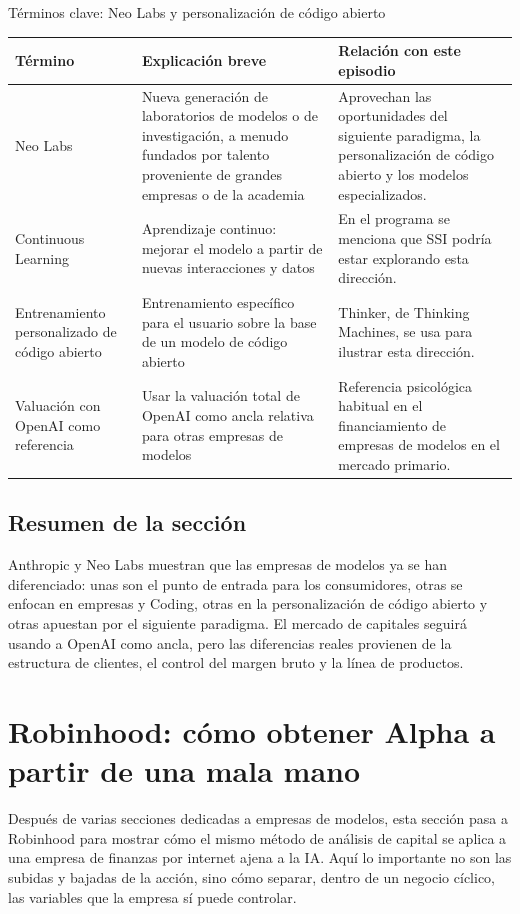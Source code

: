 \documentclass[a4paper]{article}
\begin{document}
\begin{knowledgebox}{Términos clave: Neo Labs y personalización de código abierto}
\begin{tabularx}{\textwidth}{p{}p{}X}
\toprule
Término & Explicación breve & Relación con este episodio \\
\midrule
Neo Labs & Nueva generación de laboratorios de modelos o de investigación, a menudo fundados por talento proveniente de grandes empresas o de la academia & Aprovechan las oportunidades del siguiente paradigma, la personalización de código abierto y los modelos especializados. \\
Continuous Learning & Aprendizaje continuo: mejorar el modelo a partir de nuevas interacciones y datos & En el programa se menciona que SSI podría estar explorando esta dirección. \\
Entrenamiento personalizado de código abierto & Entrenamiento específico para el usuario sobre la base de un modelo de código abierto & Thinker, de Thinking Machines, se usa para ilustrar esta dirección. \\
Valuación con OpenAI como referencia & Usar la valuación total de OpenAI como ancla relativa para otras empresas de modelos & Referencia psicológica habitual en el financiamiento de empresas de modelos en el mercado primario. \\
\bottomrule
\end{tabularx}
\end{knowledgebox}

\subsection{Resumen de la sección}

Anthropic y Neo Labs muestran que las empresas de modelos ya se han diferenciado: unas son el punto de entrada para los consumidores, otras se enfocan en empresas y Coding, otras en la personalización de código abierto y otras apuestan por el siguiente paradigma. El mercado de capitales seguirá usando a OpenAI como ancla, pero las diferencias reales provienen de la estructura de clientes, el control del margen bruto y la línea de productos.
\section{Robinhood: cómo obtener Alpha a partir de una mala mano}

Después de varias secciones dedicadas a empresas de modelos, esta sección pasa a Robinhood para mostrar cómo el mismo método de análisis de capital se aplica a una empresa de finanzas por internet ajena a la IA. Aquí lo importante no son las subidas y bajadas de la acción, sino cómo separar, dentro de un negocio cíclico, las variables que la empresa sí puede controlar.
\end{document}

